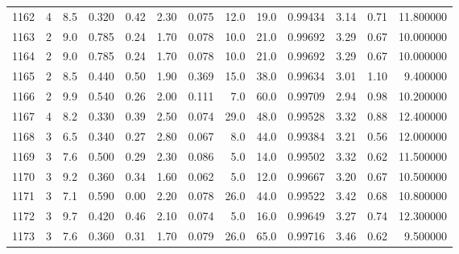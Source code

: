 \begin{tabular}{lrrrrrrrrrrrr}
1162 &        4 &            8.5 &             0.320 &         0.42 &            2.30 &      0.075 &                 12.0 &                  19.0 &  0.99434 &  3.14 &       0.71 &  11.800000 \\
1163 &        2 &            9.0 &             0.785 &         0.24 &            1.70 &      0.078 &                 10.0 &                  21.0 &  0.99692 &  3.29 &       0.67 &  10.000000 \\
1164 &        2 &            9.0 &             0.785 &         0.24 &            1.70 &      0.078 &                 10.0 &                  21.0 &  0.99692 &  3.29 &       0.67 &  10.000000 \\
1165 &        2 &            8.5 &             0.440 &         0.50 &            1.90 &      0.369 &                 15.0 &                  38.0 &  0.99634 &  3.01 &       1.10 &   9.400000 \\
1166 &        2 &            9.9 &             0.540 &         0.26 &            2.00 &      0.111 &                  7.0 &                  60.0 &  0.99709 &  2.94 &       0.98 &  10.200000 \\
1167 &        4 &            8.2 &             0.330 &         0.39 &            2.50 &      0.074 &                 29.0 &                  48.0 &  0.99528 &  3.32 &       0.88 &  12.400000 \\
1168 &        3 &            6.5 &             0.340 &         0.27 &            2.80 &      0.067 &                  8.0 &                  44.0 &  0.99384 &  3.21 &       0.56 &  12.000000 \\
1169 &        3 &            7.6 &             0.500 &         0.29 &            2.30 &      0.086 &                  5.0 &                  14.0 &  0.99502 &  3.32 &       0.62 &  11.500000 \\
1170 &        3 &            9.2 &             0.360 &         0.34 &            1.60 &      0.062 &                  5.0 &                  12.0 &  0.99667 &  3.20 &       0.67 &  10.500000 \\
1171 &        3 &            7.1 &             0.590 &         0.00 &            2.20 &      0.078 &                 26.0 &                  44.0 &  0.99522 &  3.42 &       0.68 &  10.800000 \\
1172 &        3 &            9.7 &             0.420 &         0.46 &            2.10 &      0.074 &                  5.0 &                  16.0 &  0.99649 &  3.27 &       0.74 &  12.300000 \\
1173 &        3 &            7.6 &             0.360 &         0.31 &            1.70 &      0.079 &                 26.0 &                  65.0 &  0.99716 &  3.46 &       0.62 &   9.500000 \\

\end{tabular}
